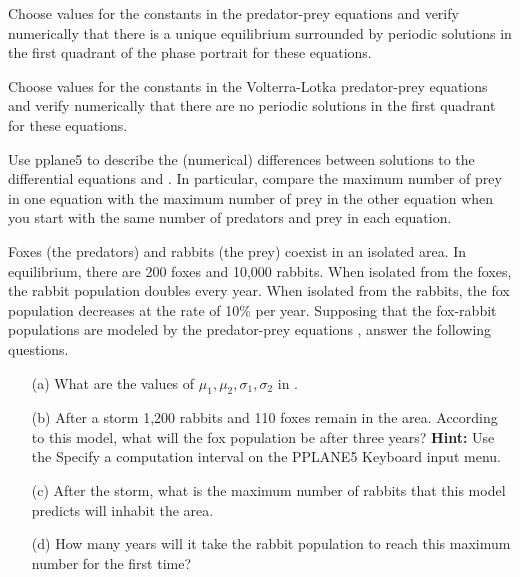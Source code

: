 \begin{exercise} \label{c9.1.3}
Choose values for the constants in the predator-prey equations 
 and verify numerically that there is a unique 
equilibrium surrounded by periodic solutions in the first 
quadrant of the phase portrait for these equations.
\end{exercise}

\begin{exercise} \label{c9.1.4}
Choose values for the constants in the Volterra-Lotka predator-prey equations 
 and verify numerically that there are no periodic solutions in 
the first quadrant for these equations.
\end{exercise}

\begin{exercise} \label{c9.1.7}
Use {\sf pplane5} to describe the (numerical) differences between solutions 
to the differential equations  and .  In particular,
compare the maximum number of prey in one equation with the maximum number of 
prey in the other equation when you start with the same number of predators 
and prey in each equation.
\end{exercise}

\begin{exercise} \label{c9.1.8}
Foxes (the predators) and rabbits (the prey) coexist in an isolated area.
In equilibrium, there are 200 foxes and 10,000 rabbits.  When isolated from
the foxes, the rabbit population doubles every year.  When isolated from 
the rabbits, the fox population decreases at the rate of 10\% per year. 
Supposing that the fox-rabbit populations are modeled by the predator-prey
equations , answer the following questions.
\begin{itemize}
\item[(a)]  	What are the values of $\mu_1,\mu_2,\sigma_1,\sigma_2$ in 
.
\item[(b)]	After a storm 1,200 rabbits and 110 foxes remain in the area.
According to this model, what will the fox population be after three years?  
{\bf Hint:}  Use the {\sf Specify a computation interval} on the 
{\sf PPLANE5 Keyboard input} menu.
\item[(c)]	After the storm, what is the maximum number of rabbits that 
this model predicts will inhabit the area.
\item[(d)]	How many years will it take the rabbit population to reach 
this maximum number for the first time?
\end{itemize}
\end{exercise}


